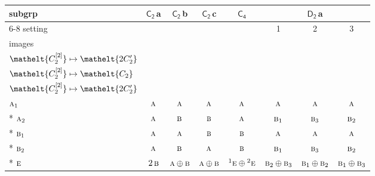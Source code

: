 \documentclass[10pt,a4paper]{article}
\numberwithin{equation}{section}
\newcommand{\eltfont}[1]{{\let\sigma\eltsigma\mathelt{#1}}}
\newcommand{\grp}[1]{\mathsf{#1}}
\newcommand{\irr}[1]{\text{\normalfont\scshape #1}}
\newcommand{\conjpair}[1]{{}^{#1}}
\newcommand{\cls}[1]{\eltfont{#1}}
\newcommand{\clsletter}[1]{\,{\scriptsize\color{black!55}#1}}
\newcommand{\genidx}[2]{#1^{[\mathrm{#2}]}}
\begin{document}
{\small\begin{longtable}{@{}lccccccc@{}}\toprule
subgrp & \href{C2.pdf}{$\grp{C_{2}}$}\clsletter{a} & \href{C2.pdf}{$\grp{C_{2}}$}\clsletter{b} & \href{C2.pdf}{$\grp{C_{2}}$}\clsletter{c} & \href{C4.pdf}{$\grp{C_{4}}$} & \multicolumn{3}{c}{\href{D2.pdf}{$\grp{D_{2}}$}\clsletter{a}}\\\cmidrule(lr){6-8}
setting &  &  &  &  & 1 & 2 & 3\\
images &  &  &  &  & {\scriptsize\begin{tabular}[t]{@{}c@{}}$\cls{\genidx{C_{2}}{1}} \mapsto \cls{C_{2}}$\\$\cls{\genidx{C_{2}}{2}} \mapsto \cls{2C_{2}'}$\end{tabular}} & {\scriptsize\begin{tabular}[t]{@{}c@{}}$\cls{\genidx{C_{2}}{1}} \mapsto \cls{2C_{2}'}$\\$\cls{\genidx{C_{2}}{2}} \mapsto \cls{C_{2}}$\end{tabular}} & {\scriptsize\begin{tabular}[t]{@{}c@{}}$\cls{\genidx{C_{2}}{1}} \mapsto \cls{2C_{2}'}$\\$\cls{\genidx{C_{2}}{2}} \mapsto \cls{2C_{2}'}$\end{tabular}}\\\midrule\endhead
\bottomrule\endfoot\endlastfoot
$\irr{a}_{1}$ & $\irr{a}$ & $\irr{a}$ & $\irr{a}$ & $\irr{a}$ & $\irr{a}$ & $\irr{a}$ & $\irr{a}$\\*
$\irr{a}_{2}$ & $\irr{a}$ & $\irr{b}$ & $\irr{b}$ & $\irr{a}$ & $\irr{b}_{1}$ & $\irr{b}_{3}$ & $\irr{b}_{2}$\\*
$\irr{b}_{1}$ & $\irr{a}$ & $\irr{a}$ & $\irr{b}$ & $\irr{b}$ & $\irr{a}$ & $\irr{a}$ & $\irr{a}$\\*
$\irr{b}_{2}$ & $\irr{a}$ & $\irr{b}$ & $\irr{a}$ & $\irr{b}$ & $\irr{b}_{1}$ & $\irr{b}_{3}$ & $\irr{b}_{2}$\\*
$\irr{e}$ & $2\,\irr{b}$ & $\irr{a}\oplus \irr{b}$ & $\irr{a}\oplus \irr{b}$ & $\conjpair{1}\irr{e}\oplus \conjpair{2}\irr{e}$ & $\irr{b}_{2}\oplus \irr{b}_{3}$ & $\irr{b}_{1}\oplus \irr{b}_{2}$ & $\irr{b}_{1}\oplus \irr{b}_{3}$\\
\bottomrule\end{longtable}}
\end{document}
